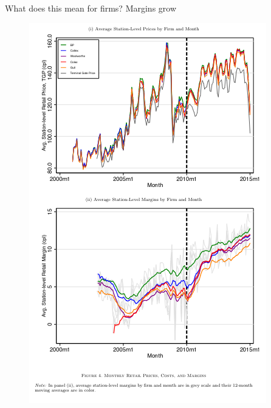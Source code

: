 \documentclass[dvipsnames]{beamer}
\begin{document}
  \begin{frame}{What does this mean for firms? Margins grow}
    \begin{figure}[htp]
      \centering
      \includegraphics[width=0.55\textheight, keepaspectratio=true]{fig4.png}
    \end{figure}
  \end{frame}
\end{document}
